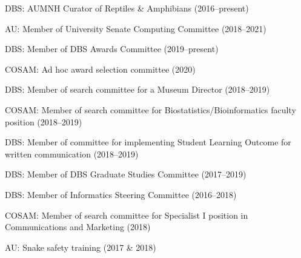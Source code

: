 \begin{veryTightItemize}
    \item DBS: AUMNH Curator of Reptiles \& Amphibians (2016--present)
    \item AU: Member of University Senate Computing Committee (2018--2021)
    \item DBS: Member of DBS Awards Committee (2019--present)
    \item COSAM: Ad hoc award selection committee (2020)
    \item DBS: Member of search committee for a Museum Director (2018--2019)
    \item COSAM: Member of search committee for Biostatistics/Bioinformatics
        faculty position (2018--2019)
    \item DBS: Member of committee for implementing Student Learning Outcome
        for written communication (2018--2019)
    \item DBS: Member of DBS Graduate Studies Committee (2017--2019)
    \item DBS: Member of Informatics Steering Committee (2016--2018)
    \item COSAM: Member of search committee for Specialist I position in
        Communications and Marketing (2018)
    \item AU: Snake safety training (2017 \& 2018)
\end{veryTightItemize}
